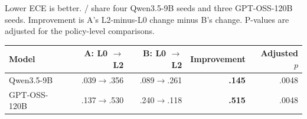 {\fontsize{8.5}{9.7}\selectfont\setlength{\tabcolsep}{4pt}
 Lower ECE is better. \armA{}/\armB{} share four Qwen3.5-9B seeds and three GPT-OSS-120B seeds. Improvement is A's L2-minus-L0 change minus B's change. P-values are adjusted for the policy-level comparisons.
\par\begin{tabularx}{\linewidth}{@{}Xrrrr@{}}\toprule
Model & A: L0 $\to$ L2 & B: L0 $\to$ L2 & Improvement & Adjusted $p$\\\midrule
\rowcolor{blue!4}Qwen3.5-9B & .039$\to$.356 & .089$\to$.261 & \textbf{.145} & .0048\\
\rowcolor{orange!6}GPT-OSS-120B & .137$\to$.530 & .240$\to$.118 & \textbf{.515} & .0048\\\bottomrule
\end{tabularx}}
